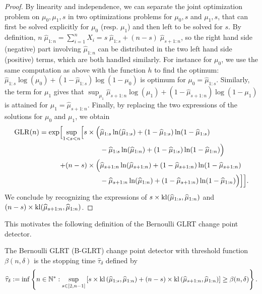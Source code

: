 \begin{proof}
    By linearity and independence, we can separate the joint optimization problem on $\mu_0,\mu_1,s$ in two optimizations problems for $\mu_0,s$ and $\mu_1,s$, that can first be solved explicitly for $\mu_0$ (resp. $\mu_1$) and then left to be solved for $s$.
    By definition, $n \; \widehat{\mu}_{1:n} = \sum_{i=1}^n X_i = s \;\widehat{\mu}_{1:s} + (n-s) \;\widehat{\mu}_{s+1:n}$, so the right hand side (negative) part involving $\widehat{\mu}_{1:n}$ can be distributed in the two left hand side (positive) terms,
    which are both handled similarly.
    For instance for $\mu_0$, we use the same computation as above with the function $h$ to find the optimum:
    $\widehat{\mu}_{1:s} \log(\mu_0) + (1 - \widehat{\mu}_{1:s}) \log(1-\mu_0)$
    is optimum for $\mu_0 = \widehat{\mu}_{1:s}$.
    Similarly, the term for $\mu_1$ gives that $\sup_{\mu_1} \widehat{\mu}_{s+1:n} \log(\mu_1) + (1 - \widehat{\mu}_{s+1:n}) \log(1-\mu_1)$
    is attained for $\mu_1 = \widehat{\mu}_{s+1:n}$.
    Finally, by replacing the two expressions of the solutions for $\mu_0$ and $\mu_1$,
    we obtain
    \begin{align*}
        \mathrm{GLR}(n)
        = \exp \Bigl[ \sup\limits_{1 < s < n} \Bigl[
            s \times \Bigl(
                    & \widehat{\mu}_{1:s} \ln(\widehat{\mu}_{1:s}) + (1 - \widehat{\mu}_{1:s}) \ln(1-\widehat{\mu}_{1:s}) \\
                    & - \widehat{\mu}_{1:s} \ln(\widehat{\mu}_{1:n}) + (1 - \widehat{\mu}_{1:s}) \ln(1-\widehat{\mu}_{1:n})
            \Bigr) \\
            + (n-s) \times \Bigl(
                & \widehat{\mu}_{s+1:n} \ln(\widehat{\mu}_{s+1:n}) + (1 - \widehat{\mu}_{s+1:n}) \ln(1-\widehat{\mu}_{s+1:n}) \\
                & - \widehat{\mu}_{s+1:n} \ln(\widehat{\mu}_{1:n}) + (1 - \widehat{\mu}_{s+1:n}) \ln(1-\widehat{\mu}_{1:n})
            \Bigr)
        \Bigr] \Bigr].
    \end{align*}
    We conclude by recognizing the expressions of $s \times \mathrm{kl}(\widehat{\mu}_{1:s}, \widehat{\mu}_{1:n})$
    and $(n-s) \times \mathrm{kl}(\widehat{\mu}_{s+1:n}, \widehat{\mu}_{1:n})$.
\end{proof}


This motivates the following definition of the Bernoulli GLRT change point detector.

\begin{definition}\label{def:6:GLRDef}
    The Bernoulli GLRT (B-GLRT) change point detector with threshold function $\beta(n,\delta)$ is the stopping time $\widehat{\tau}_{\delta}$ defined by
    \begin{equation}\label{def:6:GLR}
        \widehat{\tau}_{\delta} := \inf \left\{ n \in \mathbb{N}^* : \sup_{s \in [2,n-1]} \left[s \times \mathrm{kl}\left(\widehat{\mu}_{1:s},\widehat{\mu}_{1:n}\right) + (n-s) \times \mathrm{kl}\left(\widehat{\mu}_{s+1:n},\widehat{\mu}_{1:n}\right)\right] \geq \beta(n,\delta)\right\}.
    \end{equation}
\end{definition}

